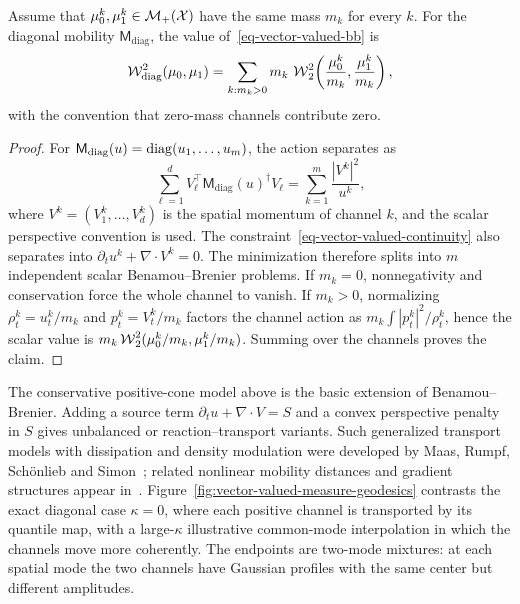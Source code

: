 \begin{prop}\label{prop-diagonal-positive-vector-bb}
Assume that $\mu_0^k,\mu_1^k\in\mathcal{M}_+(\mathcal{X})$ have the same mass $m_k$ for every $k$. For the diagonal mobility $\mathsf M_{\mathrm{diag}}$, the value of~\eqref{eq-vector-valued-bb} is
\[
	\mathcal W_{\mathrm{diag}}^2(\mu_0,\mu_1)
	=
	\sum_{k:m_k>0} m_k\,\operatorname{\mathcal{W}}_2^2\!\left(\frac{\mu_0^k}{m_k},\frac{\mu_1^k}{m_k}\right),
\]
with the convention that zero-mass channels contribute zero.
\end{prop}
\begin{proof}
For $\mathsf M_{\mathrm{diag}}(u)=\operatorname{diag}(u_1,\ldots,u_m)$, the action separates as
\[
	\sum_{\ell=1}^d V_\ell^\top \mathsf M_{\mathrm{diag}}(u)^\dagger V_\ell
	=
	\sum_{k=1}^m \frac{|V^k|^2}{u^k},
\]
where $V^k=(V_1^k,\ldots,V_d^k)$ is the spatial momentum of channel $k$, and the scalar perspective convention is used. The constraint~\eqref{eq-vector-valued-continuity} also separates into $\partial_t u^k+\nabla\cdot V^k=0$. The minimization therefore splits into $m$ independent scalar Benamou--Brenier problems. If $m_k=0$, nonnegativity and conservation force the whole channel to vanish. If $m_k>0$, normalizing $\rho_t^k=u_t^k/m_k$ and $p_t^k=V_t^k/m_k$ factors the channel action as $m_k\int |p_t^k|^2/\rho_t^k$, hence the scalar value is $m_k\operatorname{\mathcal{W}}_2^2(\mu_0^k/m_k,\mu_1^k/m_k)$. Summing over the channels proves the claim.
\end{proof}

The conservative positive-cone model above is the basic extension of Benamou--Brenier. Adding a source term $\partial_t u+\nabla\cdot V=S$ and a convex perspective penalty in $S$ gives unbalanced or reaction--transport variants. Such generalized transport models with dissipation and density modulation were developed by Maas, Rumpf, Sch{\"o}nlieb and Simon~\cite{maas2015generalized,maas2016generalized}; related nonlinear mobility distances and gradient structures appear in~\cite{dolbeault2009new,MielkeCVPDE}. Figure~\ref{fig:vector-valued-measure-geodesics} contrasts the exact diagonal case $\kappa=0$, where each positive channel is transported by its quantile map, with a large-$\kappa$ illustrative common-mode interpolation in which the channels move more coherently. The endpoints are two-mode mixtures: at each spatial mode the two channels have Gaussian profiles with the same center but different amplitudes.

